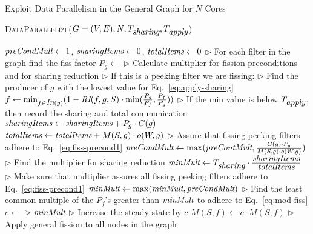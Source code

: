 \begin{algorithm}[th!]
\caption{Exploit Data Parallelism in the General Graph for $N$ Cores} \label {alg:data-parallelize}
\textsc{DataParallelize}($G = (V, E), N, T_{\mbox{\it sharing}}, T_{\mbox{\it apply}} $)
\begin{algorithmic}[1]
\State $\mbox{\it preCondMult} \gets 1$, $\mbox{\it sharingItems} \gets 0$, $\mbox{\it totalItems} \gets 0$
\State $\triangleright$ For each filter in the graph find the fiss factor
\State $P_g \gets $  
\EndFor
\Statex
\State $\triangleright$ Calculate multiplier for fission preconditions and for sharing reduction
\State $\triangleright$ If this is a peeking filter we are fissing:
\State $\triangleright$ Find the producer of $g$ with the lowest
value for Eq.~\ref{eq:apply-sharing}
\State $f \gets \min_{f \in \mbox{\it In}(g)} (1 -\mbox{\it RI}(f,g, S) \cdot
\min(\frac{P_g}{P_f},\frac{P_f}{P_g} )) $
\label{ln:dp1}
\State $\triangleright$ If the min value is below $T_{\mbox{\it apply}}$,
then record the sharing and total communication
\State $\mbox{\it sharingItems} \gets \mbox{\it sharingItems} + P_g \cdot C(g)$
\State $\mbox{\it totalItems} \gets \mbox{\it totalItems} + M(S,g) \cdot o(W, g)$
\EndIf 
\State $\triangleright$ Assure that fissing peeking filters adhere to Eq.~\ref{eq:fiss-precond1}
\State $\mbox{\it preCondMult} \gets \max(\mbox{\it preContMult}, \frac{C(g) \cdot P_g}{M(S,g)
 \cdot o(W,g)})$  
\label{ln:dp3}
\EndIf
\EndFor
\Statex
\State $\triangleright$ Find the multiplier for sharing reduction
\State $\mbox{\it minMult} \gets T_{\mbox{\it sharing}} \cdot \frac{\mbox{\it sharingItems}
}{\mbox{\it totalItems}}$
\label{ln:dp2}
\State $\triangleright$ Make sure that multiplier assures all fissing peeking filters
adhere to  Eq.~\ref{eq:fiss-precond1}
\State $\mbox{\it minMult} \gets \max(\mbox{\it minMult}, \mbox{\it preCondMult})$
\State $\triangleright$ Find the least common multiple of the $P_f$'s
greater than $\mbox{\it minMult}$ to adhere to Eq.~\ref{eq:mod-fiss}
\State $c \gets $ $ >
\mbox{\it minMult}$
\Statex
\label{ln:dp4}
\State $\triangleright$ Increase the steady-state by $c$
\State $M(S,f) \gets c \cdot M(S, f)$
\EndFor
\Statex
\State $\triangleright$ Apply general fission to all nodes in the graph
\State {}
\EndFor
\end{algorithmic}
\vspace{10pt}
\end{algorithm}


